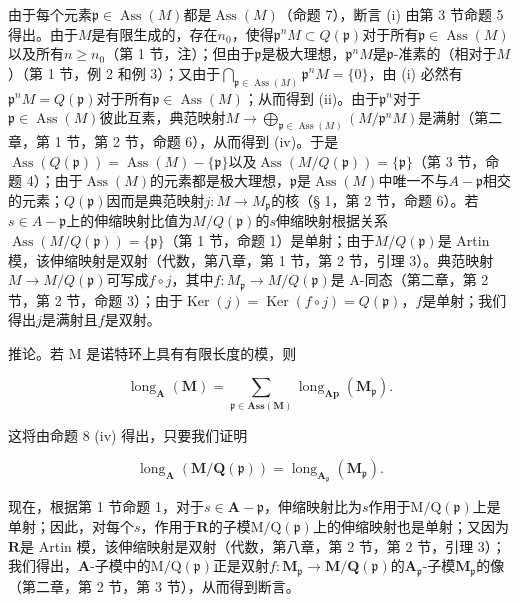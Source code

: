 由于每个元素\(\mathfrak{p} \in \operatorname{Ass}(M)\)都是\(\operatorname{Ass}(M)\)（命题 7），断言 (i) 由第 3 节命题 5 得出。由于\(M\)是有限生成的，存在\(n_0\)，使得\(\mathfrak{p}^n M \subset Q(\mathfrak{p})\)对于所有\(\mathfrak{p} \in \operatorname{Ass}(M)\)以及所有\(n \geqslant n_0\)（第 1 节，注）；但由于\(\mathfrak{p}\)是极大理想，\(\mathfrak{p}^n M\)是\(\mathfrak{p}\)-准素的（相对于\(M\)）（第 1 节，例 2 和例 3）；又由于\(\bigcap_{\mathfrak{p} \in \operatorname{Ass}(M)} \mathfrak{p}^n M = \{0\}\)，由 (i) 必然有\(\mathfrak{p}^n M = Q(\mathfrak{p})\)对于所有\(\mathfrak{p} \in \operatorname{Ass}(M)\)；从而得到 (ii)。由于\(\mathfrak{p}^n\)对于\(\mathfrak{p} \in \operatorname{Ass}(M)\)彼此互素，典范映射\(M \to \bigoplus_{\mathfrak{p} \in \operatorname{Ass}(M)} (M / \mathfrak{p}^n M)\)是满射（第二章，第 1 节，第 2 节，命题 6），从而得到 (iv)。于是\(\operatorname{Ass}(Q(\mathfrak{p})) = \operatorname{Ass}(M) - \{\mathfrak{p}\}\)以及\(\operatorname{Ass}(M / Q(\mathfrak{p})) = \{\mathfrak{p}\}\)（第 3 节，命题 4）；由于\(\operatorname{Ass}(M)\)的元素都是极大理想，\(\mathfrak{p}\)是\(\operatorname{Ass}(M)\)中唯一不与\(A - \mathfrak{p}\)相交的元素；\(Q(\mathfrak{p})\)因而是典范映射\(j: M \to M_{\mathfrak{p}}\)的核（§ 1，第 2 节，命题 6）。若\(s \in A - \mathfrak{p}\)上的伸缩映射比值为\(M / Q(\mathfrak{p})\)的\(s\)伸缩映射根据关系\(\operatorname{Ass}(M / Q(\mathfrak{p})) = \{\mathfrak{p}\}\)（第 1 节，命题 1）是单射；由于\(M / Q(\mathfrak{p})\)是 Artin 模，该伸缩映射是双射（代数，第八章，第 1 节，第 2 节，引理 3）。典范映射\(M \to M / Q(\mathfrak{p})\)可写成\(f \circ j\)，其中\(f: M_{\mathfrak{p}} \to M / Q(\mathfrak{p})\)是 A-同态（第二章，第 2 节，第 2 节，命题 3）；由于\(\operatorname{Ker}(j) = \operatorname{Ker}(f \circ j) = Q(\mathfrak{p})\)，\(f\)是单射；我们得出\(j\)是满射且\(f\)是双射。

推论。若 M 是诺特环上具有有限长度的模，则

\[
\operatorname{long} _ {\mathbf {A}} (\mathbf {M}) = \sum_ {\mathfrak {p} \in \mathbf {A s s} (\mathbf {M})} \operatorname{long} _ {\mathbf {A p}} (\mathbf {M} _ {\mathfrak {p}}).\tag{4}
\]

这将由命题 8 (iv) 得出，只要我们证明

\[
\operatorname{long} _ {\mathbf {A}} (\mathbf {M} / \mathbf {Q} (\mathfrak {p})) = \operatorname{long} _ {\mathbf {A} _ {\mathfrak {p}}} (\mathbf {M} _ {\mathfrak {p}}).
\]

现在，根据第 1 节命题 1，对于\(s \in \mathbf{A} - \mathfrak{p}\)，伸缩映射比为\(s\)作用于\(\mathrm{M} / \mathrm{Q}(\mathfrak{p})\)上是单射；因此，对每个\(s\)，作用于\(\mathbf{R}\)的子模\(\mathrm{M} / \mathrm{Q}(\mathfrak{p})\)上的伸缩映射也是单射；又因为\(\mathbf{R}\)是 Artin 模，该伸缩映射是双射（代数，第八章，第 2 节，第 2 节，引理 3）；我们得出，\(\mathbf{A}\)-子模中的\(\mathrm{M} / \mathrm{Q}(\mathfrak{p})\)正是双射\(f: \mathbf{M}_{\mathfrak{p}} \to \mathbf{M} / \mathbf{Q}(\mathfrak{p})\)的\(\mathbf{A}_{\mathfrak{p}}\)-子模\(\mathbf{M}_{\mathfrak{p}}\)的像（第二章，第 2 节，第 3 节），从而得到断言。

